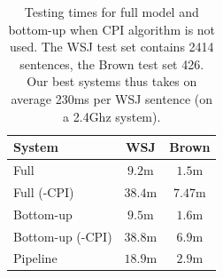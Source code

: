 
\begin{table}[ht]

    \centering
    \begin{tabular}{|p{3.0cm}|c|c|}\hline
        System                           & WSJ       & Brown   \\\hline 
        Full                             & $9.2$m    & $1.5$m  \\
        Full (-CPI)                      & $38.4$m   & $7.47$m  \\
        Bottom-up                        & $9.5$m    & $1.6$m  \\
        Bottom-up (-CPI)                 & $38.8$m   & $6.9$m  \\
        Pipeline                         & $18.9$m   & $2.9$m  \\\hline
    \end{tabular}
    \caption{Testing times for full model and bottom-up when CPI algorithm is
    not used. The WSJ test set contains 2414 sentences, the Brown test set 426. Our best systems thus takes on average 230ms per WSJ sentence (on a 2.4Ghz system). }
    \label{tbl:nocpi}
\end{table}


